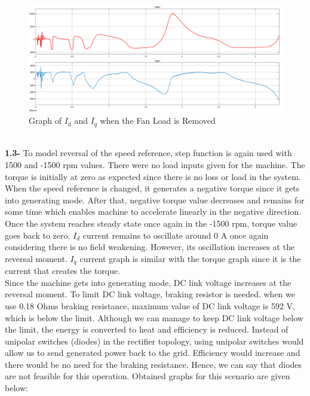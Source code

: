 \documentclass{article}
\newcommand\tab[1][1cm]{\hspace*{#1}}
\begin{document}
\begin{figure}[H]
    \centering
    \includegraphics[scale=0.2]{q2_dq currents.png}
    \caption{Graph of $I_d$ and $I_q$ when the Fan Load is Removed }
    \label{fig:my_label}
\end{figure} \\
\newline \textbf{1.3-} To model reversal of the speed reference, step function is again used with 1500 and -1500 rpm values. There were no load inputs given for the machine. The torque is initially at zero as expected since there is no loss or load in the system. When the speed reference is changed, it generates a negative torque since it gets into generating mode. After that, negative torque value decreases and remains for some time which enables machine to accelerate linearly in the negative direction. Once the system reaches steady state once again in the -1500 rpm, torque value goes back to zero. $I_d$ current remains to oscillate around 0 A once again considering there is no field weakening. However, its oscillation increases at the reversal moment. $I_q$ current graph is similar with the torque graph since it is the current that creates the torque. \\
\tab Since the machine gets into generating mode, DC link voltage increases at the reversal moment. To limit DC link voltage, braking resistor is needed. when we use 0.18 Ohms braking resistance, maximum value of DC link voltage is 592 V, which is below the limit. Although we can manage to keep DC link voltage below the limit, the energy is converted to heat and efficiency is reduced. Instead of unipolar switches (diodes) in the rectifier topology, using unipolar switches would allow us to send generated power back to the grid. Efficiency would increase and there would be no need for the braking resistance. Hence, we can say that diodes are not feasible for this operation. Obtained graphs for this scenario are given below: \\
\end{document}
